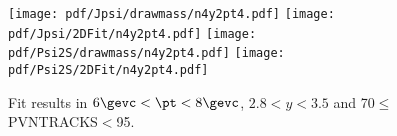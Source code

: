 \begin{figure}[H]
\begin{center}
\texttt{[image: pdf/Jpsi/drawmass/n4y2pt4.pdf]}
\texttt{[image: pdf/Jpsi/2DFit/n4y2pt4.pdf]}
\vspace*{-0.5cm}
\texttt{[image: pdf/Psi2S/drawmass/n4y2pt4.pdf]}
\texttt{[image: pdf/Psi2S/2DFit/n4y2pt4.pdf]}
\vspace*{-0.5cm}
\end{center}
\caption{Fit results in $6\gevc<\pt<8\gevc$, $2.8<y<3.5$ and 70$\leq$PVNTRACKS$<$95.}
\label{Fitn4y2pt4}
\end{figure}
